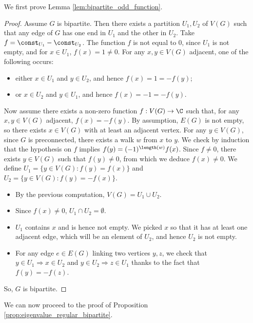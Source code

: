 We first prove Lemma \ref{lem:bipartite_odd_function}.

\begin{proof}
  Assume $G$ is bipartite. Then there exists a partition $U_1, U_2$ of $V(G)$
  such that any edge of $G$ has one end in $U_1$ and the other in $U_2$.
  Take $f = \const_{U_1}-\const_{U_2}$.
  The function $f$ is not equal to $0$, since $U_1$ is not empty,
  and for $x \in U_1$, $f(x)=1 \neq 0$.
  For any $x, y \in V(G)$ adjacent, one of the following occurs:
  \begin{itemize}
    \item either $x \in U_1$ and $y \in U_2$, and hence $f(x)=1=-f(y)$;
    \item or $x \in U_2$ and $y \in U_1$, and hence $f(x)=-1=-f(y)$.
  \end{itemize}

  Now assume there exists a non-zero function $f : V(G) \rightarrow \C$
  such that, for any $x, y \in V(G)$ adjacent, $f(x)=-f(y)$.
  By assumption, $E(G)$ is not empty, so there exists $x \in V(G)$ with
  at least an adjacent vertex.
  For any $y \in V(G)$, since $G$ is preconnected, there exists
  a walk $w$ from $x$ to $y$. We check by induction that the hypothesis on $f$
  implies $f(y) = (-1)^{\length(w)}f(x)$. Since $f \neq 0$, there exists $y \in V(G)$
  such that $f(y) \neq 0$, from which we deduce $f(x) \neq 0$.
  We define $U_1=\{y \in V(G) : f(y)=f(x)\}$ and $U_2=\{y \in V(G) : f(y)=-f(x)\}$.
\begin{itemize}
  \item By the previous computation, $V(G) = U_1 \cup U_2$.
  \item Since $f(x) \neq 0$, $U_1 \cap U_2 = \emptyset$.
  \item $U_1$ contains $x$ and is hence not empty. We picked $x$ so that it has
  at least one adjacent edge, which will be an element of $U_2$, and hence $U_2$ is
  not empty.
  \item For any edge $e \in E(G)$ linking two vertices $y, z$,
  we check that $y \in U_1 \Rightarrow x \in U_2$
  and $y \in U_2 \Rightarrow z \in U_1$ thanks to the fact that $f(y)=-f(z)$.
\end{itemize}
So, $G$ is bipartite.
\end{proof}

We can now proceed to the proof of Proposition \ref{prop:eigenvalue_regular_bipartite}.


